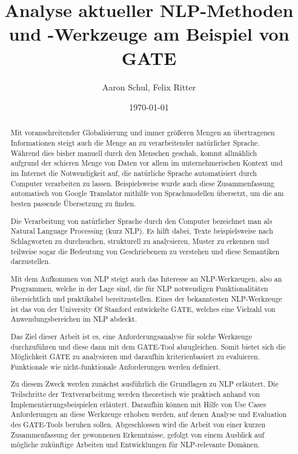 \documentclass[12pt]{report}
\begin{document}
\title{Analyse aktueller NLP-Methoden und -Werkzeuge am Beispiel von GATE}
\author{Aaron Schul, Felix Ritter}
\date{\today}
\maketitle

\newpage
\begin{abstract}
Mit voranschreitender Globalisierung und immer größeren Mengen an übertragenen Informationen steigt auch die Menge an zu verarbeitender natürlicher Sprache. Während dies bisher manuell durch den Menschen geschah, kommt allmählich aufgrund der schieren Menge von Daten vor allem im unternehmerischen Kontext und im Internet die Notwendigkeit auf, die natürliche Sprache automatisiert durch Computer verarbeiten zu lassen. Beispielsweise wurde auch diese Zusammenfassung automatisch von Google Translator mithilfe von Sprachmodellen übersetzt, um die am besten passende Übersetzung zu finden.

Die Verarbeitung von natürlicher Sprache durch den Computer bezeichnet man als Natural Language Processing (kurz NLP). Es hilft dabei, Texte beispielsweise nach Schlagworten zu durchsuchen, strukturell zu analysieren, Muster zu erkennen und teilweise sogar die Bedeutung von Geschriebenem zu verstehen und diese Semantiken darzustellen.

Mit dem Aufkommen von NLP steigt auch das Interesse an NLP-Werkzeugen, also an Programmen, welche in der Lage sind, die für NLP notwendigen Funktionalitäten übersichtlich und praktikabel bereitzustellen. Eines der bekanntesten NLP-Werkzeuge ist das von der University Of Stanford entwickelte GATE, welches eine Vielzahl von Anwendungsbereichen im NLP abdeckt.

Das Ziel dieser Arbeit ist es, eine Anforderungsanalyse für solche Werkzeuge durchzuführen und diese dann mit dem GATE-Tool abzugleichen. Somit bietet sich die Möglichkeit GATE zu analysieren und daraufhin kriterienbasiert zu evaluieren. Funktionale wie nicht-funktionale Anforderungen werden definiert.

Zu diesem Zweck werden zunächst ausführlich die Grundlagen zu NLP erläutert. Die Teilschritte der Textverarbeitung werden theoretisch wie praktisch anhand von Implementierungsbeispielen erläutert. Daraufhin können mit Hilfe von Use Cases Anforderungen an diese Werkzeuge erhoben werden, auf denen Analyse und Evaluation des GATE-Tools beruhen sollen. Abgeschlossen wird die Arbeit von einer kurzen Zusammenfassung der gewonnenen Erkenntnisse, gefolgt von einem Ausblick auf mögliche zukünftige Arbeiten und Entwicklungen für NLP-relevante Domänen.
\end{abstract}
\end{document}
